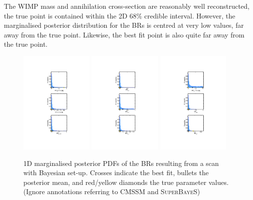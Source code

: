 \documentclass{article}
\begin{document}
The WIMP mass and annihilation cross-section are reasonably well reconstructed, the true point is contained within the 2D $68\%$ credible interval. However, the marginalised posterior distribution for the BRs is centred at very low values, far away from the true point. Likewise, the best fit point is also quite far away from the true point. \\
\begin{figure}
\centering
\includegraphics[trim = 205 100 202 100, clip = true, width=0.32\textwidth]{figs/1D_Posterior_BR_1}
\includegraphics[trim = 205 100 202 100, clip = true, width=0.32\textwidth]{figs/1D_Posterior_BR_2}
\includegraphics[trim = 205 100 202 100, clip = true, width=0.32\textwidth]{figs/1D_Posterior_BR_3}
\caption{1D marginalised posterior PDFs of the BRs resulting from a scan with Bayesian set-up. Crosses indicate the best fit, bullets the posterior mean, and red/yellow diamonds the true parameter values. (Ignore annotations referring to CMSSM and \textsc{SuperBayeS})}
\label{1DpostBR}
\end{figure}
\end{document}
